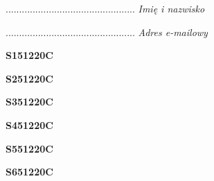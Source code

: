 \begin{turn}{90}\begin{minipage}{\linewidth} \vspace{20mm} ................................................  \textit{Imię i nazwisko}\end{minipage}\end{turn}

\begin{turn}{90}\begin{minipage}{\linewidth} \vspace{20mm} ................................................  \textit{Adres e-mailowy}\end{minipage}\end{turn}

\begin{turn}{90}\huge \begin{minipage}{\linewidth} \vspace{10mm}\textbf{S151220C}\end{minipage}\end{turn}

\begin{turn}{90}\huge \begin{minipage}{\linewidth} \vspace{10mm}\textbf{S251220C}\end{minipage}\end{turn}

\begin{turn}{90}\huge \begin{minipage}{\linewidth} \vspace{10mm}\textbf{S351220C}\end{minipage}\end{turn}

\begin{turn}{90}\huge \begin{minipage}{\linewidth} \vspace{10mm}\textbf{S451220C}\end{minipage}\end{turn}

\begin{turn}{90}\huge \begin{minipage}{\linewidth} \vspace{10mm}\textbf{S551220C}\end{minipage}\end{turn}

\begin{turn}{90}\huge \begin{minipage}{\linewidth} \vspace{10mm}\textbf{S651220C}\end{minipage}\end{turn}

